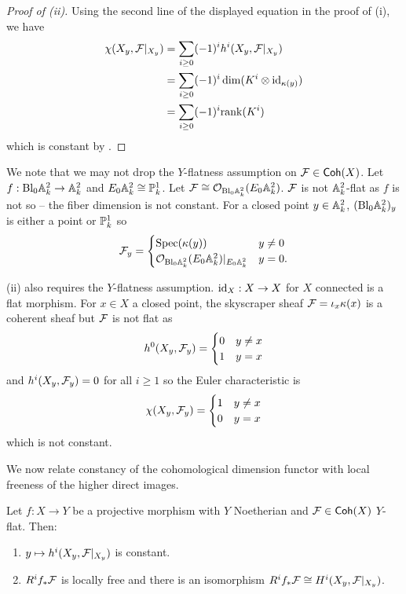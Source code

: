 \begin{proof}[Proof of (ii)]
    Using the second line of the displayed equation in the proof of (i), we have 
    \begin{align*}
        \chi(X_{y},\mathcal{F}|_{X_{y}})&=\sum_{i\geq0}(-1)^{i}h^{i}(X_{y},\mathcal{F}|_{X_{y}})\\ 
        &=\sum_{i\geq0}(-1)^{i}\dim(K^{i}\otimes\mathrm{id}_{\kappa(y)})\\
        &=\sum_{i\geq0}(-1)^{i}\mathrm{rank}(K^{i})
    \end{align*}
    which is constant by . 
\end{proof}
\begin{remark}
    We note that we may not drop the $Y$-flatness assumption on $\mathcal{F}\in\mathsf{Coh}(X)$. Let $f:\mathrm{Bl}_{0}\mathbb{A}^{2}_{k}\to\mathbb{A}^{2}_{k}$ and $E_{0}\mathbb{A}^{2}_{k}\cong\mathbb{P}^{1}_{k}$. Let $\mathcal{F}\cong\mathcal{O}_{\mathrm{Bl}_{0}\mathbb{A}^{2}_{k}}(E_{0}\mathbb{A}^{2}_{k})$. $\mathcal{F}$ is not $\mathbb{A}^{2}_{k}$-flat as $f$ is not so -- the fiber dimension is not constant. For a closed point $y\in\mathbb{A}^{2}_{k}$, $(\mathrm{Bl}_{0}\mathbb{A}^{2}_{k})_{y}$ is either a point or $\mathbb{P}^{1}_{k}$ so 
    $$\mathcal{F}_{y}=\begin{cases}
        \operatorname{Spec}(\kappa(y)) & y\neq0 \\
        \mathcal{O}_{\mathrm{Bl}_{0}\mathbb{A}^{2}_{k}}(E_{0}\mathbb{A}^{2}_{k})|_{E_{0}\mathbb{A}^{2}_{k}} & y=0.
    \end{cases}$$

     (ii) also requires the $Y$-flatness assumption. $\mathrm{id}_{X}:X\to X$ for $X$ connected is a flat morphism. For $x\in X$ a closed point, the skyscraper sheaf $\mathcal{F}=\iota_{x}\kappa(x)$ is a coherent sheaf but $\mathcal{F}$ is not flat as
    $$h^{0}(X_{y},\mathcal{F}_{y})=\begin{cases}
        0 & y\neq x \\ 1 & y=x
    \end{cases}$$
    and $h^{i}(X_{y},\mathcal{F}_{y})=0$ for all $i\geq 1$ so the Euler characteristic is
    $$\chi(X_{y},\mathcal{F}_{y})=\begin{cases}
        1 & y\neq x \\ 0 & y=x
    \end{cases}$$
    which is not constant. 
\end{remark}
We now relate constancy of the cohomological dimension functor with local freeness of the higher direct images. 
\begin{proposition}\label{prop: constant cohomology dimension iff higher direct images are locally free}
    Let $f:X\to Y$ be a projective morphism with $Y$ Noetherian and $\mathcal{F}\in\mathsf{Coh}(X)$ $Y$-flat. Then: 
    \begin{enumerate}[label=(\alph*)]
        \item  $y\mapsto h^{i}(X_{y},\mathcal{F}|_{X_{y}})$ is constant. 
        \item $R^{i}f_{*}\mathcal{F}$ is locally free and there is an isomorphism $R^{i}f_{*}\mathcal{F}\cong H^{i}(X_{y},\mathcal{F}|_{X_{y}})$. 
    \end{enumerate}
\end{proposition}
